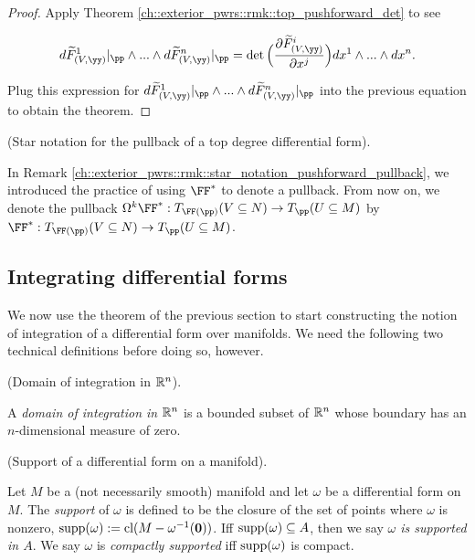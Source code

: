 \begin{proof}
    Apply Theorem \ref{ch::exterior_pwrs::rmk::top_pushforward_det} to see
    
    \begin{align*}
        d\tF_{(V, \yy)}^1|_\pp \wedge ... \wedge d\tF_{(V, \yy)}^n|_\pp = \det\Big(\frac{\pd \tF_{(V, \yy)}^i}{\pd x^j} \Big) dx^1 \wedge ... \wedge dx^n.
    \end{align*}
    
    Plug this expression for $d\tF_{(V, \yy)}^1|_\pp \wedge ... \wedge d\tF_{(V, \yy)}^n|_\pp$ into the previous equation to obtain the theorem.
\end{proof}

\begin{remark}
\label{ch::diff_forms::rmk::pullback_star_notation}
    (Star notation for the pullback of a top degree differential form).
    
    In Remark \ref{ch::exterior_pwrs::rmk::star_notation_pushforward_pullback}, we introduced the practice of using $\FF^*$ to denote a pullback. From now on, we denote the pullback $\Omega^k \FF^*:T_{\FF(\pp)}(V \subseteq N) \rightarrow T_\pp(U \subseteq M)$ by $\FF^*:T_{\FF(\pp)}(V \subseteq N) \rightarrow T_\pp(U \subseteq M)$.
\end{remark}

\subsection*{Integrating differential forms}

We now use the theorem of the previous section to start constructing the notion of integration of a differential form over manifolds. We need the following two technical definitions before doing so, however.

\begin{defn}
     (Domain of integration in $\mathbb{R}^n$).
    
    A \textit{domain of integration in $\mathbb{R}^n$} is a bounded subset of $\mathbb{R}^n$ whose boundary has an $n$-dimensional measure of zero.
\end{defn}

\begin{defn}
     (Support of a differential form on a manifold).
        
    Let $M$ be a (not necessarily smooth) manifold and let $\omega$ be a differential form on $M$. The \textit{support} of $\omega$ is defined to be the closure of the set of points where $\omega$ is nonzero, $\text{supp}(\omega) := \text{cl}(M - \omega^{-1}(\mathbf{0}))$. Iff $\text{supp}(\omega) \subseteq A$, then we say \textit{$\omega$ is supported in $A$}. We say $\omega$ is \textit{compactly supported} iff $\text{supp}(\omega)$ is compact.
\end{defn}


